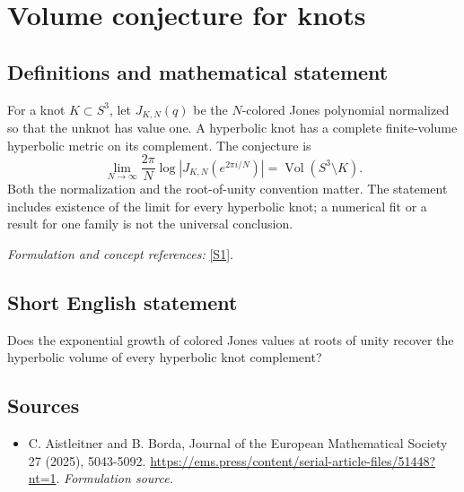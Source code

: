 \documentclass[11pt]{article}
\begin{document}
\section*{\texorpdfstring{Volume conjecture for knots}{Volume conjecture for knots}}\label{121}
\subsection{Definitions and mathematical statement}
For a knot $K\subset S^3$, let $J_{K,N}(q)$ be the $N$-colored Jones polynomial normalized so that the unknot has value one. A hyperbolic knot has a complete finite-volume hyperbolic metric on its complement. The conjecture is
\[
 \lim_{N\to\infty}\frac{2\pi}{N}\log\left|J_{K,N}(e^{2\pi i/N})\right|
 =\operatorname{Vol}(S^3\setminus K).
\]
Both the normalization and the root-of-unity convention matter. The statement includes existence of the limit for every hyperbolic knot; a numerical fit or a result for one family is not the universal conclusion.
\par\smallskip\textit{Formulation and concept references:} \href{https://ems.press/content/serial-article-files/51448?nt=1}{[S1]}.

\subsection{Short English statement}
Does the exponential growth of colored Jones values at roots of unity recover the hyperbolic volume of every hyperbolic knot complement?
\subsection{Sources}
\begin{itemize}
\item[S1]C. Aistleitner and B. Borda, Journal of the European Mathematical Society 27 (2025), 5043-5092.
\url{https://ems.press/content/serial-article-files/51448?nt=1}.
\textit{Formulation source.}
\end{itemize}
\end{document}
